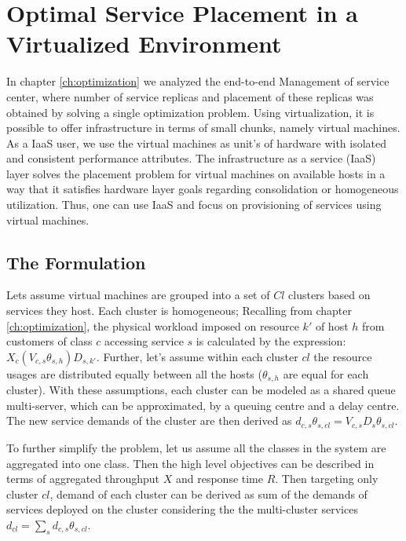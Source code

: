 
  \chapter{Optimal Service Placement in a Virtualized Environment}  
  \label{ch:optimization-virtualized} 
  In chapter \ref{ch:optimization}  we analyzed the end-to-end  Management of service center, where number of service replicas and placement of these replicas was obtained by solving a single optimization problem.  
 Using virtualization, it is possible to offer infrastructure in terms of small chunks, namely virtual machines. As a IaaS user, we use the virtual machines as unit's of hardware with isolated and consistent performance attributes. The infrastructure as a service (IaaS) layer   solves the placement problem for virtual machines on available hosts in a way that it satisfies hardware layer goals regarding consolidation or homogeneous utilization. Thus, one can use IaaS and focus on provisioning of services using virtual machines.  

 \section{The Formulation}
Lets assume virtual machines are grouped into a set of $Cl$ clusters based on services they host. Each cluster is homogeneous; %
   Recalling from chapter \ref{ch:optimization}, the physical workload imposed on resource $k'$ of host $h$ from customers of class $c$ accessing service $s$ is calculated by the expression: $X_c (V_{c,s} \theta_{s,h}) D_{s,k'}$.   Further, let's assume within each cluster $cl$ the resource usages are distributed equally between all the hosts  ($\theta_{s,h}$ are equal  for each cluster). With these assumptions, each cluster can be modeled as a shared queue multi-server, which can be approximated, by a queuing centre and a delay centre. The new service demands of the cluster are then derived as $d_{c,s}\theta_{s,cl}= V_{c,s} D_s \theta_{s,cl}$. 
   
   To further simplify the problem, let us assume all the classes in the system are aggregated into one class. Then the high level objectives can be described in terms of aggregated throughput $X$ and response time $R$.   %
  Then targeting only cluster $cl$, demand of each cluster can be derived as sum of the demands of services deployed on the cluster considering the the multi-cluster services 
  $d_{cl}=\sum_s d_{c,s}\theta_{s,cl}$.    %

